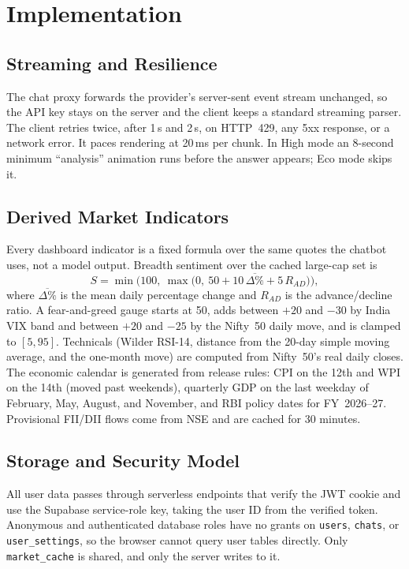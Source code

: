 \documentclass[conference]{IEEEtran}
\newcommand{\code}[1]{\texttt{\small #1}}
\begin{document}
\section{Implementation}

\subsection{Streaming and Resilience}
The chat proxy forwards the provider's server-sent event stream unchanged, so the API key stays on the server and the client keeps a standard streaming parser. The client retries twice, after 1\,s and 2\,s, on HTTP~429, any 5xx response, or a network error. It paces rendering at 20\,ms per chunk. In High mode an 8-second minimum ``analysis'' animation runs before the answer appears; Eco mode skips it.

\subsection{Derived Market Indicators}
Every dashboard indicator is a fixed formula over the same quotes the chatbot uses, not a model output. Breadth sentiment over the cached large-cap set is
\begin{equation}
S = \min\!\Big(100,\ \max\big(0,\ 50 + 10\,\overline{\Delta\%} + 5\,R_{AD}\big)\Big),
\label{eq:sentiment}
\end{equation}
where $\overline{\Delta\%}$ is the mean daily percentage change and $R_{AD}$ is the advance/decline ratio. A fear-and-greed gauge starts at 50, adds between $+20$ and $-30$ by India VIX band and between $+20$ and $-25$ by the Nifty~50 daily move, and is clamped to $[5, 95]$. Technicals (Wilder RSI-14, distance from the 20-day simple moving average, and the one-month move) are computed from Nifty~50's real daily closes. The economic calendar is generated from release rules: CPI on the 12th and WPI on the 14th (moved past weekends), quarterly GDP on the last weekday of February, May, August, and November, and RBI policy dates for FY~2026--27. Provisional FII/DII flows come from NSE and are cached for 30 minutes.

\subsection{Storage and Security Model}
All user data passes through serverless endpoints that verify the JWT cookie and use the Supabase service-role key, taking the user ID from the verified token. Anonymous and authenticated database roles have no grants on \code{users}, \code{chats}, or \code{user\_settings}, so the browser cannot query user tables directly. Only \code{market\_cache} is shared, and only the server writes to it.
\end{document}
